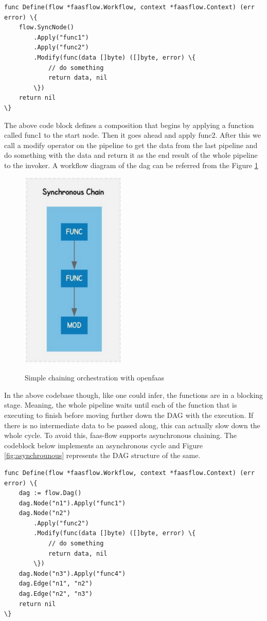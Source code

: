 \documentclass[12pt,titlepage]{article}
\begin{document}
\begin{lstlisting}
func Define(flow *faasflow.Workflow, context *faasflow.Context) (err error) \{
    flow.SyncNode()
        .Apply("func1")
        .Apply("func2")
        .Modify(func(data []byte) ([]byte, error) \{
            // do something
            return data, nil
        \})
    return nil
\}
\end{lstlisting}

The above code block defines a composition that begins by applying a function
called func1 to the start node. Then it goes ahead and apply func2. After this
we call a modify operator on the pipeline to get the data from the last pipeline
and do something with the data and return it as the end result of the whole
pipeline to the invoker. A workflow diagram of the dag can be referred from the
Figure \ref{fig:syncnode}
\begin{figure}[!h]
    \caption{Simple chaining orchestration with openfaas}
    \centering
    \includegraphics[width=50mm]{./thesis_images/syncnode.png}
    \label{fig:syncnode}
\end{figure}
In the above codebase though, like one could infer, the functions are in a
blocking stage. Meaning, the whole pipeline waits until each of the function
that is executing to finish before moving further down the DAG with the
execution. If there is no intermediate data to be passed along, this can
actually slow down the whole cycle. To avoid this, faas-flow supports
asynchronous chaining. The codeblock below implements an asynchronous cycle and
Figure \ref{fig:asynchrounous} represents the DAG structure of the same.

\begin{lstlisting}
func Define(flow *faasflow.Workflow, context *faasflow.Context) (err error) \{
    dag := flow.Dag()
    dag.Node("n1").Apply("func1")
    dag.Node("n2")
        .Apply("func2")
        .Modify(func(data []byte) ([]byte, error) \{
            // do something
            return data, nil
        \})
    dag.Node("n3").Apply("func4")
    dag.Edge("n1", "n2")
    dag.Edge("n2", "n3")
    return nil
\}
\end{lstlisting}
\end{document}

